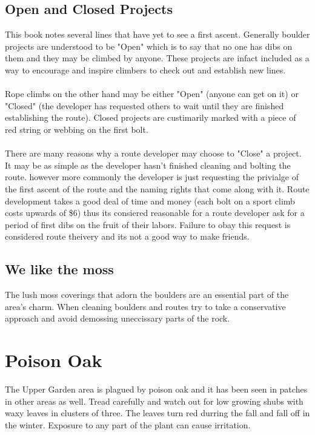 \subsection*{Open and Closed Projects}
This book notes several lines that have yet to see a first ascent. Generally boulder projects are understood to be "Open" which is to say that no one has dibs on them and they may be climbed by anyone. These projects are infact included as a way to encourage and inspire climbers to check out and establish new lines.\\
\\
Rope climbs on the other hand may be either "Open" (anyone can get on it) or "Closed" (the developer has requested others to wait until they are finished establishing the route). Closed projects are custimarily marked with a piece of red string or webbing on the first bolt.\\
\\
There are many reasons why a route developer may choose to "Close" a project. It may be as simple as the developer hasn't finished cleaning and bolting the route. however more commonly the developer is just requesting the privialge of the first ascent of the route and the naming rights that come along with it. Route development takes a good deal of time and money (each bolt on a sport climb costs upwards of \$6) thus its consiered reasonable for a route developer ask for a period of first dibs on the fruit of their labors. Failure to obay this request is considered route theivery and its not a good way to make friends.\\
\subsection*{We like the moss}
The lush moss coverings that adorn the boulders are an essential part of the area's charm. When cleaning boulders and routes try to take a conservative approach and avoid demossing uneccissary parts of the rock.
\section{Poison Oak}
The Upper Garden area is plagued by poison oak and it has been seen in patches in other areas as well. Tread carefully and watch out for low growing shubs with waxy leaves in clusters of three. The leaves turn red durring the fall and fall off in the winter. Exposure to any part of the plant can cause irritation.\\


